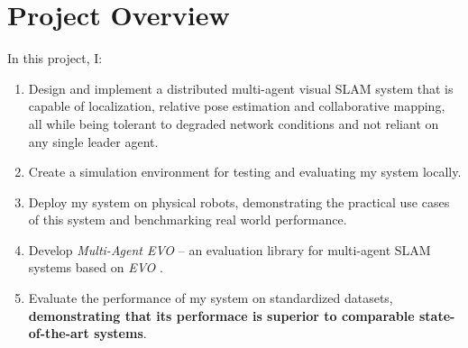 \section{Project Overview}
\label{sec:project-overview}
In this project, I: \noparskip
{
    \begin{enumerate}
        \item Design and implement a distributed multi-agent visual SLAM system that is capable of localization, relative pose estimation and  collaborative mapping, all while being tolerant to degraded network conditions and not reliant on any single leader agent.
        \item Create a simulation environment for testing and evaluating my system locally.
        \item Deploy my system on physical robots, demonstrating the practical use cases of this system and benchmarking real world performance.
        \item Develop \textit{Multi-Agent EVO} – an evaluation library for multi-agent SLAM systems based on \textit{EVO} \autocite{grupp2017evo}.
        \item Evaluate the performance of my system on standardized datasets, \textbf{demonstrating that its performace is superior to comparable state-of-the-art systems}.
    \end{enumerate}
}
